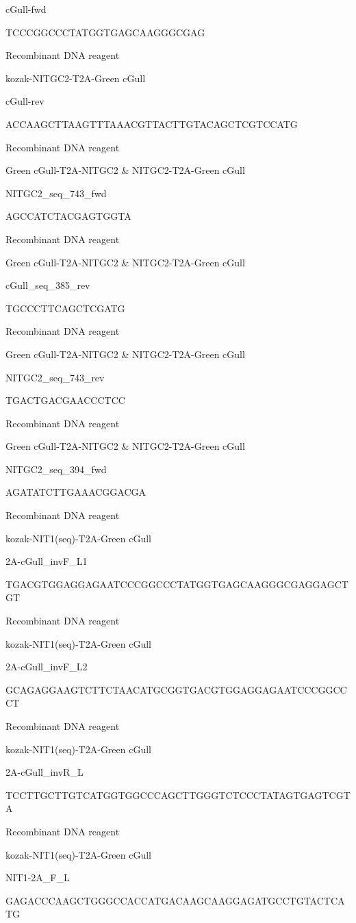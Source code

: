 \documentclass[
  10pt,
  onecolumn]{article}
\begin{document}
cGull-fwd

TCCCGGCCCTATGGTGAGCAAGGGCGAG

Recombinant DNA reagent

kozak-NITGC2-T2A-Green cGull

cGull-rev

ACCAAGCTTAAGTTTAAACGTTACTTGTACAGCTCGTCCATG

Recombinant DNA reagent

Green cGull-T2A-NITGC2 \& NITGC2-T2A-Green cGull

NITGC2\_seq\_743\_fwd

AGCCATCTACGAGTGGTA

Recombinant DNA reagent

Green cGull-T2A-NITGC2 \& NITGC2-T2A-Green cGull

cGull\_seq\_385\_rev

TGCCCTTCAGCTCGATG

Recombinant DNA reagent

Green cGull-T2A-NITGC2 \& NITGC2-T2A-Green cGull

NITGC2\_seq\_743\_rev

TGACTGACGAACCCTCC

Recombinant DNA reagent

Green cGull-T2A-NITGC2 \& NITGC2-T2A-Green cGull

NITGC2\_seq\_394\_fwd

AGATATCTTGAAACGGACGA

Recombinant DNA reagent

kozak-NIT1(seq)-T2A-Green cGull

2A-cGull\_invF\_L1

TGACGTGGAGGAGAATCCCGGCCCTATGGTGAGCAAGGGCGAGGAGCTGT

Recombinant DNA reagent

kozak-NIT1(seq)-T2A-Green cGull

2A-cGull\_invF\_L2

GCAGAGGAAGTCTTCTAACATGCGGTGACGTGGAGGAGAATCCCGGCCCT

Recombinant DNA reagent

kozak-NIT1(seq)-T2A-Green cGull

2A-cGull\_invR\_L

TCCTTGCTTGTCATGGTGGCCCAGCTTGGGTCTCCCTATAGTGAGTCGTA

Recombinant DNA reagent

kozak-NIT1(seq)-T2A-Green cGull

NIT1-2A\_F\_L

GAGACCCAAGCTGGGCCACCATGACAAGCAAGGAGATGCCTGTACTCATG
\end{document}
